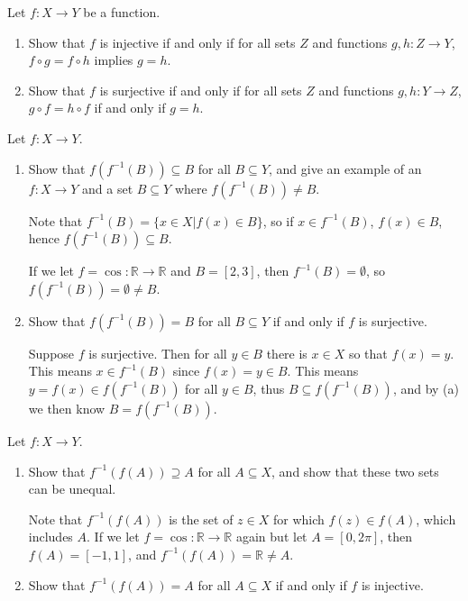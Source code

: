 \documentclass[11pt,dvipsnames]{book}
\numberwithin{equation}{section} %
\numberwithin{figure}{section} %
\numberwithin{table}{section} %
\begin{document}
\begin{exercise} Let $f:X\rightarrow Y$ be a function. 

\begin{enumerate}[label=(\alph*)]
\item Show that $f$ is injective if and only if for all sets $Z$ and functions $g,h:Z\rightarrow Y$, $f\circ g=f\circ h$ implies $g=h$. 
\item Show that $f$ is surjective if and only if for all sets $Z$ and functions $g,h:Y\rightarrow Z$, $g\circ f = h\circ f$ if and only if $g=h$. 
\end{enumerate}


\end{exercise}




\begin{exercise}
Let $f:X\rightarrow Y$. 
\begin{enumerate}[label=(\alph*)]
\item Show that $f(f^{-1}(B))\subseteq B$ for all $B\subseteq Y$, and give an example of an $f:X\rightarrow Y$ and a set $B\subseteq Y$ where $f(f^{-1}(B))\neq B$.
\begin{solution}
Note that $f^{-1}(B)=\{x\in X|f(x)\in B\}$, so if $x\in f^{-1}(B)$, $f(x)\in B$, hence $f(f^{-1}(B))\subseteq B$. 

If we let $f=\cos:\mathbb{R}\rightarrow \mathbb{R}$ and $B=[2,3]$, then $f^{-1}(B)=\emptyset$, so $f(f^{-1}(B))=\emptyset\neq B$.
\end{solution}
\item Show that $f(f^{-1}(B))=B$ for all $B\subseteq Y$ if and only if $f$ is surjective.
\begin{solution}
Suppose $f$ is surjective. Then for all $y\in B$ there is $x\in X$ so that $f(x)=y$. This means $x\in f^{-1}(B)$ since $f(x)=y\in B$.  This means $y=f(x)\in f(f^{-1}(B))$ for all $y\in B$, thus $B\subseteq f(f^{-1}(B))$, and by (a) we then know $B = f(f^{-1}(B))$. 
\end{solution}
\end{enumerate}
\end{exercise}




\begin{exercise}
Let $f:X\rightarrow Y$. 
\begin{enumerate}[label=(\alph*)]
\item Show that $f^{-1}(f(A))\supseteq A$ for all $A\subseteq X$, and show that these two sets can be unequal.
\begin{solution}
Note that $f^{-1}(f(A))$ is the set of $z\in X$ for which $f(z)\in f(A)$, which includes $A$. If we let $f=\cos:\mathbb{R}\rightarrow \mathbb{R}$ again but let $A=[0,2\pi]$, then $f(A)=[-1,1]$, and $f^{-1}(f(A))=\mathbb{R}\neq A$.
\end{solution}
\item Show that $f^{-1}(f(A))=A$ for all $A\subseteq X$ if and only if $f$ is injective. 
\end{enumerate}
\end{exercise}
\end{document}
